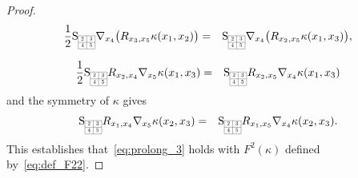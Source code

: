 \documentclass[11pt,a4paper]{article}
\theoremstyle{plain}
\theoremstyle{remark}
\newcommand{\rmS}{\mathrm{S}}
\begin{document}
\begin{proof}
\begin{eqnarray*}
\frac{1}{2}\rmS_{\scaleto{\begin{array}{|c|c|}
\cline{1-2}
2 & 3 \\
\cline{1-2}
4 & 5 \\
\cline{1-2} 
\end{array}}{12pt}}\nabla_{x_4} \big (R_{x_3,x_5} \kappa(x_1,x_2)\big ) &=& \rmS_{\scaleto{\begin{array}{|c|c|}
\cline{1-2}
2 & 3 \\
\cline{1-2}
4 & 5 \\
\cline{1-2} 
\end{array}}{12pt}}\nabla_{x_4}\big (R_{x_2,x_5}\kappa(x_1,x_3)\big ),
\end{eqnarray*}

\begin{eqnarray*}
\frac{1}{2}\rmS_{\scaleto{\begin{array}{|c|c|}
\cline{1-2}
2 & 3 \\
\cline{1-2}
4 & 5 \\
\cline{1-2} 
\end{array}}{12pt}} R_{x_2,x_4} \nabla_{x_5} \kappa(x_1,x_3) &=& \rmS_{\scaleto{\begin{array}{|c|c|}
\cline{1-2}
2 & 3 \\
\cline{1-2}
4 & 5 \\
\cline{1-2} 
\end{array}}{12pt}} R_{x_2,x_5} \nabla_{x_4} \kappa(x_1,x_3) 
\end{eqnarray*}
and the symmetry of $\kappa$ gives
\begin{eqnarray*}
\rmS_{\scaleto{\begin{array}{|c|c|}
\cline{1-2}
2 & 3 \\
\cline{1-2}
4 & 5 \\
\cline{1-2} 
\end{array}}{12pt}} R_{x_1,x_4}\nabla_{x_5} \kappa(x_2,x_3) &=& \rmS_{\scaleto{\begin{array}{|c|c|}
\cline{1-2}
2 & 3 \\
\cline{1-2}
4 & 5 \\
\cline{1-2} 
\end{array}}{12pt}}R_{x_1,x_5}\nabla_{x_4}\kappa(x_2,x_3).
\end{eqnarray*}
This establishes that~\eqref{eq:prolong_3} holds with $F^2(\kappa)$ defined
by~\eqref{eq:def_F22}.
\end{proof}
\end{document}
